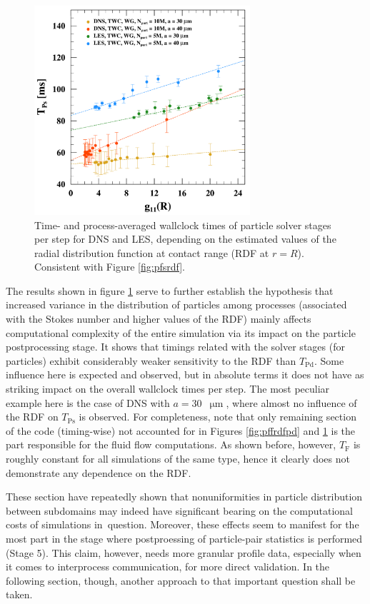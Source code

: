 \documentclass{pracamgren}
\begin{document}
\begin{figure}[h]
\centering
\includegraphics[width=8cm]{img/plots/3-3i-pffrdfps.pdf}
\caption{
Time- and process-averaged wallclock times of particle solver stages per step for DNS and LES, depending on the estimated values of the radial distribution function at contact range (RDF at $r=R$).
Consistent with Figure \ref{fig:pfsrdf}.
}
\label{fig:pffrdfps}
\end{figure}

The results shown in figure \ref{fig:pffrdfps} serve to further establish the hypothesis that increased variance in the distribution of particles among processes (associated with the Stokes number and higher values of the RDF) mainly affects computational complexity of the entire simulation via its impact on the particle postprocessing stage.
It shows that timings related with the solver stages (for particles) exhibit considerably weaker sensitivity to the RDF than $T_{\text{Pd}}$.
Some influence here is expected and observed, but in absolute terms it does not have as striking impact on the overall wallclock times per step.
The most peculiar example here is the case of DNS with $a = 30$~$\upmu\text{m}$, where almost no influence of the RDF on $T_{\text{Ps}}$ is observed.
For completeness, note that only remaining section of the code (timing-wise) not accounted for in Figures \ref{fig:pffrdfpd} and \ref{fig:pffrdfps} is the part responsible for the fluid flow computations.
As shown before, however, $T_{\text{F}}$ is roughly constant for all simulations of the same type, hence it clearly does not demonstrate any dependence on the RDF.

These section have repeatedly shown that nonuniformities in particle distribution between subdomains may indeed have significant bearing on the computational costs of simulations in~question.
Moreover, these effects seem to manifest for the most part in the stage where postproessing of particle-pair statistics is performed (Stage 5).
This claim, however, needs more granular profile data, especially when it comes to interprocess communication, for more direct validation.
In the following section, though, another approach to that important question shall be taken.
\end{document}
